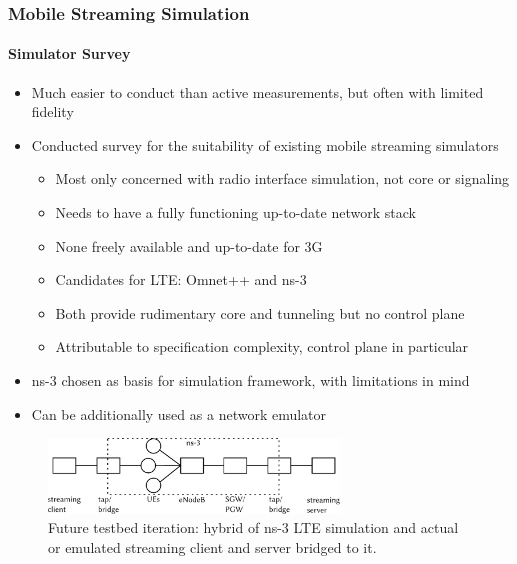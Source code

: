\documentclass{beamer}
\begin{document}
\begin{frame}
	\frametitle{Mobile Streaming Simulation}
	\framesubtitle{Simulator Survey}

	\begin{itemize}
		\item Much easier to conduct than active measurements, but often with limited fidelity
		\item Conducted survey for the suitability of existing mobile streaming simulators
		\begin{itemize}
			\item Most only concerned with radio interface simulation, not core or signaling
			\item Needs to have a fully functioning up-to-date network stack
			\item None freely available and up-to-date for 3G
			\item Candidates for LTE: Omnet++ and ns-3
			\item Both provide rudimentary core and tunneling but no control plane
			\item Attributable to specification complexity, control plane in particular
		\end{itemize}

		\item ns-3 chosen as basis for simulation framework, with limitations in mind
		\item Can be additionally used as a network emulator
	\end{itemize}
\end{frame}



\begin{frame}
	\begin{figure}
		\centering
		\includegraphics[height=2cm]{../../chapters/06-mobilestreamingmeasurements/images/streaming-hybrid.pdf}
		\caption{Future testbed iteration: hybrid of ns-3 LTE simulation and actual or emulated streaming client and server bridged to it.}
	\end{figure}
\end{frame}
\end{document}
